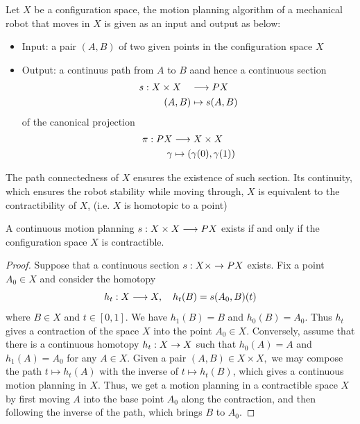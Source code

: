 \begin{defn}
    Let $X$ be a configuration space, the motion planning algorithm of a mechanical robot that moves in $X$ is given as an input and output as below:
    \begin{itemize}
        \item Input: a pair $(A,B)$ of two given points in the configuration space $X$
        \item Output: a continuus path from $A$ to $B$ aand hence a continuous section
              \begin{align*}
                  s: X \times X \quad & \longrightarrow PX        \\
                  (A,B)               & \mapsto s(A,B)
              \end{align*}
              of the canonical projection
              \begin{align*}
                  \pi: PX & \longrightarrow X \times X               \\
                  \gamma  & \mapsto (\gamma(0),\gamma(1))
              \end{align*}
    \end{itemize}
\end{defn}

\begin{rem}
    The path connectedness of $X$ ensures the existence of such section. 
    Its continuity, which ensures the robot stability while moving through, $X$  is equivalent to the contractibility of $X$, (i.e. $X$ is homotopic to a
    point)
\end{rem}

\begin{thm}\cite{farber2003topological}\label{farber:thm:1}
    A continuous motion planning $s: X \times X \longrightarrow PX$ exists if and only if the configuration space $X$ is contractible.
\end{thm}

\begin{proof}
    Suppose that a continuous section $s: X \times \rightarrow PX$ exists. Fix a point $A_0 \in X$ and consider the homotopy \[ h_t : X \longrightarrow X, \quad h_t(B) = s(A_0, B)(t) \] where $B \in X$ and $t \in [0,1]$. We have $h_1(B) = B$ and $h_0(B) = A_0$. 
    Thus $h_t$ gives a contraction of the space $X$ into the point $A_0 \in X$. Conversely, assume that there is a continuous homotopy $h_t: X \rightarrow X$ such that $h_0(A) = A$ and $h_1(A) = A_0$ for any $A \in X$. 
    Given a pair $(A,B) \in X \times X,$ we may compose the path $t \mapsto h_t(A)$ with the inverse of $t \mapsto h_t(B)$, which gives a continuous motion planning in $X$. 
    Thus, we get a motion planning in a contractible space $X$ by first moving $A$ into the base point $A_0$ along the contraction, and then following the inverse of the path, which brings $B$ to $A_0$.
\end{proof}

